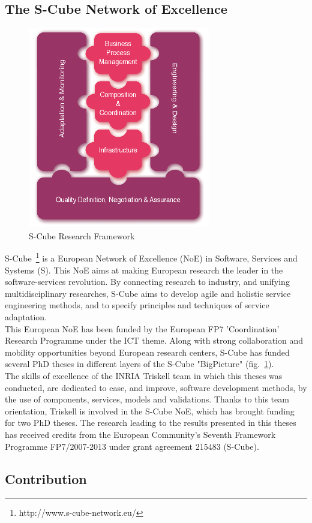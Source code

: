 \subsection{The S-Cube Network of Excellence}

\begin{figure}
	\vspace{-1.4cm}
  \centering
  \includegraphics[width=.3\textwidth]{part1/pics/scube-overview.png}
  \caption{S-Cube Research Framework}
  \label{fig:scube-overview2}
  \vspace{-1cm}  
\end{figure}
S-Cube~\footnote{http://www.s-cube-network.eu/} is a European Network of Excellence (NoE) in Software, Services and Systems (S). This NoE aims at making European research the leader in the software-services revolution. By connecting research to industry, and unifying multidisciplinary researches, S-Cube aims to develop agile and holistic service engineering methods, and to specify principles and techniques of service adaptation.\\
This European NoE has been funded by the European FP7 'Coordination' Research Programme  under the ICT theme. Along with strong collaboration and mobility opportunities beyond European research centers, S-Cube has funded several PhD theses in different layers of the S-Cube "BigPicture" (fig.~\ref{fig:scube-overview2}).\\

The skills of excellence of the INRIA Triskell team in which this theses was conducted, are dedicated to ease, and improve, software development methods, by the use of components, services, models and validations. Thanks to this team orientation, Triskell is involved in the S-Cube NoE, which has brought funding for two PhD theses. The research leading to the results presented in this theses has received credits from the European Community’s Seventh Framework Programme FP7/2007-2013 under grant agreement 215483 (S-Cube).\\

\subsection{Contribution}

